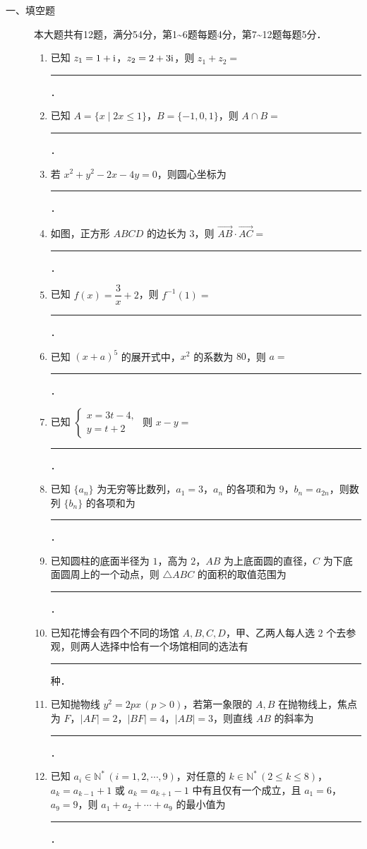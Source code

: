 \begin{description}
    \item[一、填空题] 本大题共有12题，满分54分，第1\textasciitilde6题每题4分，第7\textasciitilde12题每题5分．
    \begin{enumerate}[leftmargin=5pt]
        \item 已知 $z_1=1+\mathrm{i}$，$z_2=2+3\mathrm{i}$，则 $z_1+z_2=$ \rule[-0.3ex]{3em}{0.4pt}．
        \item 已知 $A=\{x\mid2x\leqslant1\}$，$B=\{-1,0,1\}$，则 $A\cap B=$ \rule[-0.3ex]{3em}{0.4pt}．
        \item 若 $x^2+y^2-2x-4y=0$，则圆心坐标为 \rule[-0.3ex]{3em}{0.4pt}．
        \item 如图，正方形 $ABCD$ 的边长为 $3$，则 $\overrightarrow{AB}\cdot\overrightarrow{AC}=$ \rule[-0.3ex]{3em}{0.4pt}．
        \item 已知 $f(x)=\dfrac{3}{x}+2$，则 $f^{-1}(1)=$ \rule[-0.3ex]{3em}{0.4pt}．
        \item 已知 $(x+a)^5$ 的展开式中，$x^2$ 的系数为 $80$，则 $a=$ \rule[-0.3ex]{3em}{0.4pt}．
        \item 已知 $\begin{cases}x=3t-4,\\y=t+2\end{cases}$ 则 $x-y=$ \rule[-0.3ex]{3em}{0.4pt}．
        \item 已知 $\{a_n\}$ 为无穷等比数列，$a_1=3$，$a_n$ 的各项和为 $9$，$b_n=a_{2n}$，则数列 $\{b_n\}$ 的各项和为 \rule[-0.3ex]{3em}{0.4pt}．
        \item 已知圆柱的底面半径为 $1$，高为 $2$，$AB$ 为上底面圆的直径，$C$ 为下底面圆周上的一个动点，则 $\triangle ABC$ 的面积的取值范围为 \rule[-0.3ex]{3em}{0.4pt}．
        \item 已知花博会有四个不同的场馆 $A,B,C,D$，甲、乙两人每人选 $2$ 个去参观，则两人选择中恰有一个场馆相同的选法有 \rule[-0.3ex]{3em}{0.4pt} 种．
        \item 已知抛物线 $y^2=2px\,(p>0)$，若第一象限的 $A,B$ 在抛物线上，焦点为 $F$，$|AF|=2$，$|BF|=4$，$|AB|=3$，则直线 $AB$ 的斜率为 \rule[-0.3ex]{3em}{0.4pt}．
        \item 已知 $a_i\in\mathbb{N}^*\,(i=1,2,\cdots,9)$，对任意的 $k\in\mathbb{N}^*\,(2\leqslant k\leqslant8)$，$a_k=a_{k-1}+1$ 或 $a_k=a_{k+1}-1$ 中有且仅有一个成立，且 $a_1=6$，$a_9=9$，则 $a_1+a_2+\cdots+a_9$ 的最小值为 \rule[-0.3ex]{3em}{0.4pt}．
    \end{enumerate}
\end{description}

